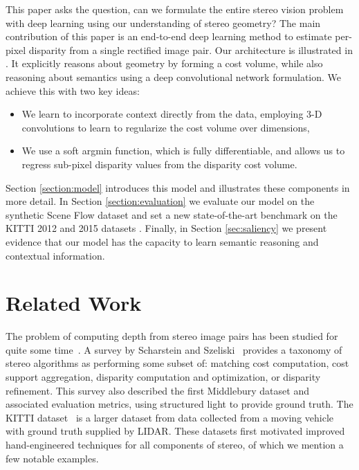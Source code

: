 \documentclass[10pt,twocolumn,letterpaper]{article}
\begin{document}
This paper asks the question, can we formulate the entire stereo vision problem with deep learning using our understanding of stereo geometry? The main contribution of this paper is an end-to-end deep learning method to estimate per-pixel disparity from a single rectified image pair. Our architecture is illustrated in . It explicitly reasons about geometry by forming a cost volume, while also reasoning about semantics using a deep convolutional network formulation. We achieve this with two key ideas:
\begin{itemize}[topsep=0pt,itemsep=-1ex,partopsep=1ex,parsep=1ex]
\item We learn to incorporate context directly from the data, employing 3-D convolutions to learn to regularize the cost volume over  dimensions,
\item We use a soft argmin function, which is fully differentiable, and allows us to regress sub-pixel disparity values from the disparity cost volume.
\end{itemize}

Section \ref{section:model} introduces this model and illustrates these components in more detail. In Section \ref{section:evaluation} we evaluate our model on the synthetic Scene Flow dataset \cite{MIFDB16} and set a new state-of-the-art benchmark on the KITTI 2012 and 2015 datasets \cite{Geiger2012CVPR,Menze2015CVPR}. Finally, in Section \ref{sec:saliency} we present evidence that our model has the capacity to learn semantic reasoning and contextual information.

\section{Related Work}
The problem of computing depth from stereo image pairs has been studied for quite some time~\cite{Barnard1982}. 
A survey by Scharstein and Szeliski~\cite{Scharstein2002} provides a taxonomy of stereo algorithms as performing some subset of: matching cost computation, cost support aggregation, disparity computation and optimization, or disparity refinement. This survey also described the first Middlebury dataset and associated evaluation metrics, using structured light to provide ground truth.  
The KITTI dataset~\cite{Geiger2012CVPR,Menze2015CVPR} is a larger dataset from data collected from a moving vehicle with ground truth supplied by LIDAR. These datasets first motivated improved hand-engineered techniques for all components of stereo, of which we mention a few notable examples.  
\end{document}
